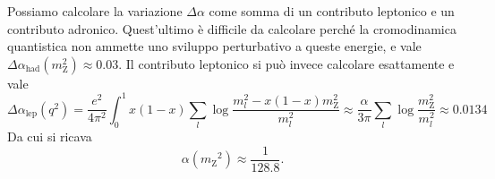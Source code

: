 \documentclass[italian,a4paper]{article}
\theoremstyle{definition}
\newcommand{\zboson}{\ensuremath{\mathrm{Z}}}
\begin{document}
Possiamo calcolare la variazione $\Delta\alpha$ come somma di un contributo
leptonico e un contributo adronico. Quest'ultimo è difficile da calcolare
perch\'e la cromodinamica quantistica non ammette uno sviluppo perturbativo
a queste energie, e vale $\Delta\alpha_{\text{had}}(m_\zboson^2) \approx
0.03$. Il contributo leptonico si pu\`o invece calcolare esattamente e vale
\begin{equation*}
    \Delta \alpha_{\text{lep}}(q^2) = \dfrac{e^2}{4\pi^2}\int_0^1 x(1 - x)
    \sum_l \log \dfrac{m_l ^ 2 - x ( 1 - x ) m_\zboson^2}{m_l ^ 2} \approx
    \dfrac{\alpha}{3\pi} \sum_l \log \dfrac{m_\zboson^2}{m_l^2} \approx
    0.0134
\end{equation*}
Da cui si ricava
\begin{equation*}
    \alpha(m_\zboson{}^2) \approx \dfrac{1}{128.8}.
\end{equation*}
\end{document}
